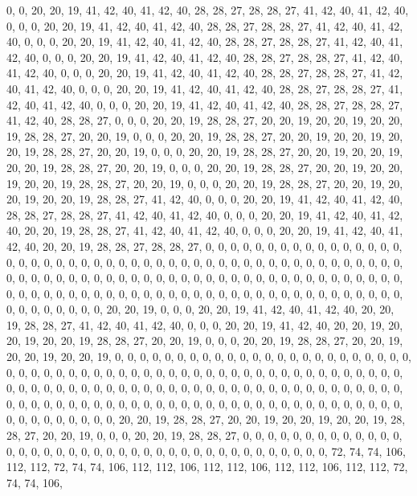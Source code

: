 0, 0, 20, 20, 19, 41, 42, 40, 41, 42, 40, 28, 28, 27, 28, 28, 27, 41, 42, 40, 41, 42, 40, 0, 0, 0, 20, 20, 19, 41, 42, 40, 41, 42, 40, 28, 28, 27, 28, 28, 27, 41, 42, 40, 41, 42, 40, 0, 0, 0, 20, 20, 19, 41, 42, 40, 41, 42, 40, 28, 28, 27, 28, 28,
27, 41, 42, 40, 41, 42, 40, 0, 0, 0, 20, 20, 19, 41, 42, 40, 41, 42, 40, 28, 28, 27, 28, 28, 27, 41, 42, 40, 41, 42, 40, 0, 0, 0, 20, 20, 19, 41, 42, 40, 41, 42, 40, 28, 28, 27, 28, 28, 27, 41, 42, 40, 41, 42, 40, 0, 0, 0, 20, 20, 19, 41, 42, 40,
41, 42, 40, 28, 28, 27, 28, 28, 27, 41, 42, 40, 41, 42, 40, 0, 0, 0, 20, 20, 19, 41, 42, 40, 41, 42, 40, 28, 28, 27, 28, 28, 27, 41, 42, 40, 28, 28, 27, 0, 0, 0, 20, 20, 19, 28, 28, 27, 20, 20, 19, 20, 20, 19, 20, 20, 19, 28, 28, 27, 20, 20, 19, 0,
0, 0, 20, 20, 19, 28, 28, 27, 20, 20, 19, 20, 20, 19, 20, 20, 19, 28, 28, 27, 20, 20, 19, 0, 0, 0, 20, 20, 19, 28, 28, 27, 20, 20, 19, 20, 20, 19, 20, 20, 19, 28, 28, 27, 20, 20, 19, 0, 0, 0, 20, 20, 19, 28, 28, 27, 20, 20, 19, 20, 20, 19, 20, 20,
19, 28, 28, 27, 20, 20, 19, 0, 0, 0, 20, 20, 19, 28, 28, 27, 20, 20, 19, 20, 20, 19, 20, 20, 19, 28, 28, 27, 41, 42, 40, 0, 0, 0, 20, 20, 19, 41, 42, 40, 41, 42, 40, 28, 28, 27, 28, 28, 27, 41, 42, 40, 41, 42, 40, 0, 0, 0, 20, 20, 19, 41, 42, 40,
41, 42, 40, 20, 20, 19, 28, 28, 27, 41, 42, 40, 41, 42, 40, 0, 0, 0, 20, 20, 19, 41, 42, 40, 41, 42, 40, 20, 20, 19, 28, 28, 27, 28, 28, 27, 0, 0, 0, 0, 0, 0, 0, 0, 0, 0, 0, 0, 0, 0, 0, 0, 0, 0, 0, 0, 0, 0, 0, 0, 0, 0, 0, 0,
0, 0, 0, 0, 0, 0, 0, 0, 0, 0, 0, 0, 0, 0, 0, 0, 0, 0, 0, 0, 0, 0, 0, 0, 0, 0, 0, 0, 0, 0, 0, 0, 0, 0, 0, 0, 0, 0, 0, 0, 0, 0, 0, 0, 0, 0, 0, 0, 0, 0, 0, 0, 0, 0, 0, 0, 0, 0, 0, 0, 0, 0, 0, 0,
0, 0, 0, 0, 0, 0, 0, 0, 0, 0, 0, 0, 0, 0, 0, 0, 0, 0, 0, 0, 0, 0, 0, 0, 0, 0, 0, 0, 20, 20, 19, 0, 0, 0, 20, 20, 19, 41, 42, 40, 41, 42, 40, 20, 20, 19, 28, 28, 27, 41, 42, 40, 41, 42, 40, 0, 0, 0, 20, 20, 19, 41, 42, 40,
20, 20, 19, 20, 20, 19, 20, 20, 19, 28, 28, 27, 20, 20, 19, 0, 0, 0, 20, 20, 19, 28, 28, 27, 20, 20, 19, 20, 20, 19, 20, 20, 19, 0, 0, 0, 0, 0, 0, 0, 0, 0, 0, 0, 0, 0, 0, 0, 0, 0, 0, 0, 0, 0, 0, 0, 0, 0, 0, 0, 0, 0, 0, 0,
0, 0, 0, 0, 0, 0, 0, 0, 0, 0, 0, 0, 0, 0, 0, 0, 0, 0, 0, 0, 0, 0, 0, 0, 0, 0, 0, 0, 0, 0, 0, 0, 0, 0, 0, 0, 0, 0, 0, 0, 0, 0, 0, 0, 0, 0, 0, 0, 0, 0, 0, 0, 0, 0, 0, 0, 0, 0, 0, 0, 0, 0, 0, 0,
0, 0, 0, 0, 0, 0, 0, 0, 0, 0, 0, 0, 0, 0, 0, 0, 0, 0, 0, 0, 0, 0, 0, 0, 0, 0, 0, 0, 0, 0, 0, 0, 0, 0, 20, 20, 19, 28, 28, 27, 20, 20, 19, 20, 20, 19, 20, 20, 19, 28, 28, 27, 20, 20, 19, 0, 0, 0, 20, 20, 19, 28, 28, 27,
0, 0, 0, 0, 0, 0, 0, 0, 0, 0, 0, 0, 0, 0, 0, 0, 0, 0, 0, 0, 0, 0, 0, 0, 0, 0, 0, 0, 0, 0, 0, 0, 0, 0, 0, 0, 0, 0, 0, 72, 74, 74, 106, 112, 112, 72, 74, 74, 106, 112, 112, 106, 112, 112, 106, 112, 112, 106, 112, 112, 72, 74, 74, 106,
